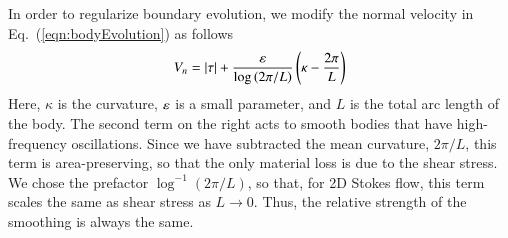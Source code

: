 \documentclass[preprint, 10pt]{elsarticle}
\begin{document}
In order to regularize boundary evolution, we modify the normal velocity
in Eq.~(\ref{eqn:bodyEvolution}) as follows
\begin{equation}
\label{eqn:Vn}
V_n = \lvert \tau \rvert + \frac{\varepsilon}{\log \left(2\pi/L \right)} \left(\kappa - \frac{2 \pi}{L} \right)
\end{equation}
Here, $\kappa$ is the curvature, $\varepsilon$ is a small parameter, and $L$ is the total arc length of the body. The second term on the right acts to smooth bodies that have high-frequency oscillations. Since we have subtracted the mean curvature, $2\pi/L$, this term is area-preserving, so that the only material loss is due to the shear stress. We chose the prefactor $\log^{-1} \left(2\pi/L \right)$, so that, for 2D Stokes flow, this term scales the same as shear stress as $L \to 0$. Thus, the relative strength of the smoothing is always the same. 
\end{document}
